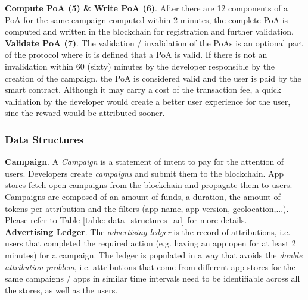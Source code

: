 \noindent \textbf{Compute \textsf{PoA} (5) \& Write \textsf{PoA} (6)}. After there are 12 components of a \textsf{PoA} for the same campaign computed within 2 minutes, the complete \textsf{PoA} is computed and written in the blockchain for registration and further validation. \\

\noindent \textbf{Validate \textsf{PoA} (7)}. The validation / invalidation of the \textsf{PoAs} is an optional part of the protocol where it is defined that a \textsf{PoA} is valid. If there is not an invalidation within 60 (sixty) minutes by the developer responsible by the creation of the campaign, the \textsf{PoA} is considered valid and the user is paid by the smart contract. Although it may carry a cost of the transaction fee, a quick validation by the developer would create a better user experience for the user, sine the reward would be attributed sooner.


\subsubsection{Data Structures}
\label{sssec:ads_ds}

\noindent \textbf{Campaign}. A \textit{Campaign} is a statement of intent to pay for the attention of users. Developers create \textit{campaigns} and submit them to the blockchain. App stores fetch open campaigns from the blockchain and propagate them to users. Campaigns are composed of an amount of funds, a duration, the amount of tokens per attribution and the filters (app name, app version, geolocation,...). Please refer to Table \ref{table: data_structures_ad} for more details. \\

\noindent \textbf{Advertising Ledger}. The \textit{advertising ledger} is the record of attributions, i.e. users that completed the required action (e.g. having an app open for at least 2 minutes) for a campaign. The ledger is populated in a way that avoids the \textit{double attribution problem}, i.e. attributions that come from different app stores for the same campaigns / apps in similar time intervals need to be identifiable across all the stores, as well as the users.

